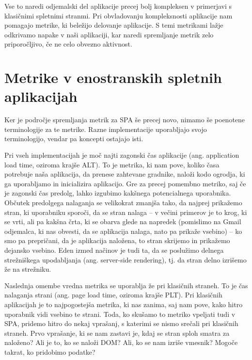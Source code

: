 \documentclass[a4paper, 12pt]{book}
\begin{document}
Vse to naredi odjemalski del aplikacije precej bolj kompleksen v primerjavi s klasičnimi spletnimi stranmi. Pri obvladovanju kompleksnosti aplikacije nam pomagajo metrike, ki beležijo delovanje aplikacije. S temi metrikami lažje odkrivamo napake v naši aplikaciji, kar naredi spremljanje metrik zelo priporočljivo, če ne celo obvezno aktivnost.

\section{Metrike v enostranskih spletnih aplikacijah}

Ker je področje spremljanja metrik za SPA še precej novo, nimamo še poenotene terminologije za te metrike. Razne implementacije uporabljajo svojo terminologijo, vendar pa koncepti ostajajo isti. \cite{linkedin_rum} \cite{mezzurite_website}

Pri vseh implementacijah je moč najti zagonski čas aplikacije (ang. application load time, oziroma krajše ALT). To je metrika, ki nam pove, koliko časa potrebuje naša aplikacija, da prenese zahtevane gradnike, naloži kodo ogrodja, ki ga uporabljamo in inicializira aplikacijo. Gre za precej pomembno metriko, saj če je zagonski čas predolg, lahko izgubimo kakšnega potencialnega uporabnika. Občutek predolgega nalaganja se velikokrat zmanjša tako, da najprej prikažemo stran, ki uporabniku sporoči, da se stran nalaga – v večini primerov je to krog, ki se vrti, ali pa kakšna črta, ki se obarva glede na napredek (pomislimo na Gmail odjemalca, ki nas obvesti, da se aplikacija nalaga, nato pa prikaže vsebino) – ko smo pa prepričani, da je aplikacija naložena, to stran skrijemo in prikažemo dejansko vsebino. Eden izmed načinov je tudi ta, da se poslužimo delnega strežniškega upodabljanja (ang. server-side rendering), tj. da stran delno izrišemo že na strežniku.

Naslednja omembe vredna metrika se uporablja že pri klasičnih straneh. To je čas nalaganja strani (ang. page load time, oziroma krajše PLT). Pri klasičnih aplikacijah je to najpogostejša metrika, ki nas zanima, saj nam pove, kako hitro uporabnik vidi vsebino te strani. Toda, ko skušamo to metriko vpeljati tudi v SPA, pridemo hitro do nekaj vprašanj, s katerimi se nismo srečali pri klasičnih straneh. Prvo vprašanje, ki se nam zastavi je, kdaj se stran sploh smatra za naloženo? Ali je to, ko se naloži DOM? Ali, ko se nam izriše vmesnik? Mogoče takrat, ko pridobimo podatke?
\end{document}
